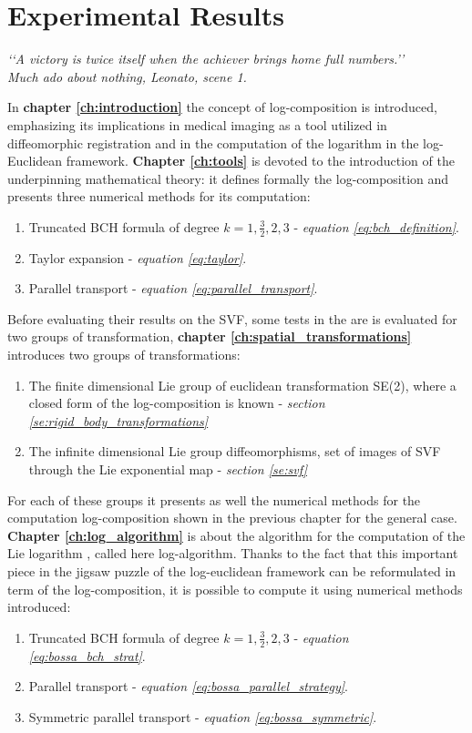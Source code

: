 \chapter{Experimental Results}\label{ch:results}

\begin{flushright}
	\emph{\lq\lq A victory is twice itself when the achiever brings home full numbers.\rq\rq \\
		       \emph{Much ado about nothing}, Leonato, scene 1.}
\end{flushright}

\vspace{0.6cm}

In {\bf chapter \ref{ch:introduction}} the concept of log-composition is introduced, emphasizing its implications in medical imaging as a tool utilized in diffeomorphic registration and in the computation of the logarithm in the log-Euclidean framework. 
{\bf Chapter \ref{ch:tools}} is devoted to the introduction of the underpinning mathematical theory: it defines formally the log-composition and presents three numerical methods for its computation:
\begin{enumerate}
	\item Truncated BCH formula of degree $k=1, \frac{3}{2}, 2, 3$ - \emph{equation \ref{eq:bch_definition}}.
	\item Taylor expansion - \emph{equation \ref{eq:taylor}}.
	\item Parallel transport - \emph{equation \ref{eq:parallel_transport}}.
\end{enumerate}
Before evaluating their results on the SVF, some tests in the are is evaluated for two groups of transformation, {\bf chapter \ref{ch:spatial_transformations}} introduces two groups of transformations:
\begin{enumerate}
	\item The finite dimensional Lie group of euclidean transformation SE(2), where a closed form of the log-composition is known - \emph{section \ref{se:rigid_body_transformations}}
	\item The infinite dimensional Lie group diffeomorphisms, set of images of SVF through the Lie exponential map - \emph{section \ref{se:svf}}
\end{enumerate}
For each of these groups it presents as well the numerical methods for the computation log-composition shown in the previous chapter for the general case.
{\bf Chapter \ref{ch:log_algorithm}} is about the algorithm for the computation of the Lie logarithm \cite{Bossa:08}, called here log-algorithm. 
Thanks to the fact that this important piece in the jigsaw puzzle of the log-euclidean framework can be reformulated in term of the log-composition, it is possible to compute it using numerical methods introduced:
\begin{enumerate}
	\item Truncated BCH formula of degree $k=1, \frac{3}{2}, 2, 3$ - \emph{equation \ref{eq:bossa_bch_strat}}.
	\item Parallel transport - \emph{equation \ref{eq:bossa_parallel_strategy}}.
	\item Symmetric parallel transport - \emph{equation \ref{eq:bossa_symmetric}}.
\end{enumerate}


